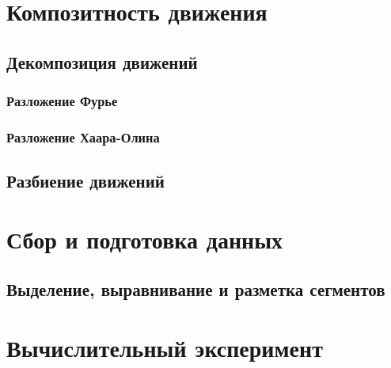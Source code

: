 \documentclass[12pt, fleqn, unicode]{article}
\begin{document}
\newpage
\section{Композитность движения}



\subsection{Декомпозиция движений}

\subsubsection{Разложение Фурье}

\subsubsection{Разложение Хаара-Олина}

\subsection{Разбиение движений}

\newpage
\section{Сбор и подготовка данных}

\subsection{Выделение, выравнивание и разметка сегментов}



\newpage
\section{Вычислительный эксперимент}



\newpage
\end{document}
